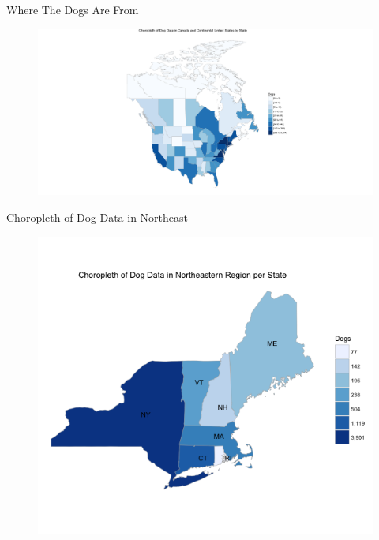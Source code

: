 \documentclass{beamer}
\begin{document}
\begin{frame}{Where The Dogs Are From}

\begin{figure}
\centering
\includegraphics[width=1.3\textwidth]{Choro_Dog.pdf}
\centering

\end{figure}

\end{frame}

\begin{frame}{Choropleth of Dog Data in Northeast}
\begin{figure}
\centering
\includegraphics[width=.9\textwidth]{Choropleth_NE_US.png}
\end{figure}

\end{frame}
\end{document}
